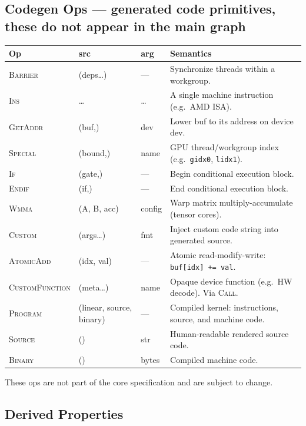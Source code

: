 \documentclass[10pt,letterpaper]{article}
\newcommand{\op}[1]{\textsc{#1}}
\begin{document}
\subsection*{Codegen Ops \normalfont\small--- generated code primitives, these do not appear in the main graph}

\begin{tabular}{@{}l l l l@{}}
\toprule
\textbf{Op} & \textbf{src} & \textbf{arg} & \textbf{Semantics} \\
\midrule
\op{Barrier} & (deps\ldots) & --- & Synchronize threads within a workgroup. \\
\op{Ins} & \ldots & \ldots & A single machine instruction (e.g.\ AMD ISA). \\
\op{GetAddr} & (buf,) & dev & Lower buf to its address on device dev. \\
\op{Special} & (bound,) & name & GPU thread/workgroup index (e.g.\ \texttt{gidx0}, \texttt{lidx1}). \\
\op{If} & (gate,) & --- & Begin conditional execution block. \\
\op{Endif} & (if,) & --- & End conditional execution block. \\
\op{Wmma} & (A, B, acc) & config & Warp matrix multiply-accumulate (tensor cores). \\
\op{Custom} & (args\ldots) & fmt & Inject custom code string into generated source. \\
\op{AtomicAdd} & (idx, val) & --- & Atomic read-modify-write: \texttt{buf[idx] += val}. \\[4pt]
\op{CustomFunction} & (meta\ldots) & name & Opaque device function (e.g.\ HW decode). Via \op{Call}. \\
\op{Program} & (linear, source, binary) & --- & Compiled kernel: instructions, source, and machine code. \\
\op{Source} & () & str & Human-readable rendered source code. \\
\op{Binary} & () & bytes & Compiled machine code. \\
\bottomrule
\end{tabular}

\smallskip
These ops are not part of the core specification and are subject to change.

\subsection*{Derived Properties}
\end{document}
